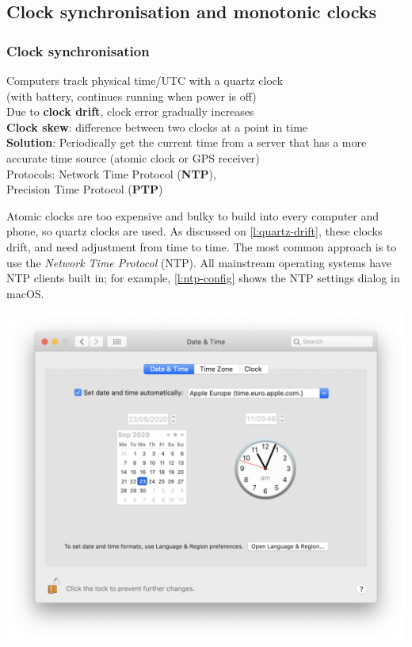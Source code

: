 \subsection{Clock synchronisation and monotonic clocks}\label{sec:clock-sync}

\begin{frame}
    \label{s:clock-sync}
    \frametitle{Clock synchronisation}
    Computers track physical time/UTC with a quartz clock\\
    (with battery, continues running when power is off)\\[1em]
    Due to \textbf{clock drift}, clock error gradually increases\\[1em]\pause
    \textbf{Clock skew}: difference between two clocks at a point in time\\[1em]\pause
    \textbf{Solution}: Periodically get the current time from a server that has a more
    accurate time source (atomic clock or GPS receiver)\\[1em]
    Protocols: Network Time Protocol (\textbf{NTP}),\\ Precision Time Protocol (\textbf{PTP})
\end{frame}
\label{l:clock-sync}

Atomic clocks are too expensive and bulky to build into every computer and phone, so quartz clocks are used.
As discussed on \autoref{l:quartz-drift}, these clocks drift, and need adjustment from time to time.
The most common approach is to use the \emph{Network Time Protocol} (NTP).
All mainstream operating systems have NTP clients built in; for example, \autoref{l:ntp-config} shows the NTP settings dialog in macOS.

\begin{frame}
    \label{s:ntp-config}
    \includegraphics[height=\paperheight]{images/ntp-config.png}
\end{frame}
\label{l:ntp-config}

